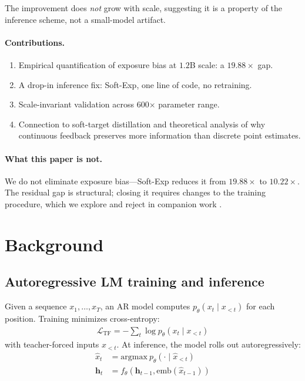 \documentclass{article}
\begin{document}
The improvement does \emph{not} grow with scale, suggesting it is a property of the inference scheme, not a small-model artifact.

\paragraph{Contributions.}
\begin{enumerate}
    \item Empirical quantification of exposure bias at $1.2$B scale: a $19.88\times$ gap.
    \item A drop-in inference fix: Soft-Exp, one line of code, no retraining.
    \item Scale-invariant validation across 600$\times$ parameter range.
    \item Connection to soft-target distillation and theoretical analysis of why continuous feedback preserves more information than discrete point estimates.
\end{enumerate}

\paragraph{What this paper is not.} We do not eliminate exposure bias---Soft-Exp reduces it from $19.88\times$ to $10.22\times$. The residual gap is structural; closing it requires changes to the training procedure, which we explore and reject in companion work \citep{wang2026failed}.

\section{Background}

\subsection{Autoregressive LM training and inference}

Given a sequence $x_1, \ldots, x_T$, an AR model computes $p_\theta(x_t \mid x_{<t})$ for each position. Training minimizes cross-entropy:
\begin{align*}
    \mathcal{L}_\text{TF} = -\sum_t \log p_\theta(x_t \mid x_{<t})
\end{align*}
with teacher-forced inputs $x_{<t}$. At inference, the model rolls out autoregressively:
\begin{align*}
    \hat{x}_t &= \mathrm{argmax}\ p_\theta(\cdot \mid \hat{x}_{<t}) \\
    \mathbf{h}_t &= f_\theta(\mathbf{h}_{t-1}, \mathrm{emb}(\hat{x}_{t-1}))
\end{align*}
\end{document}
